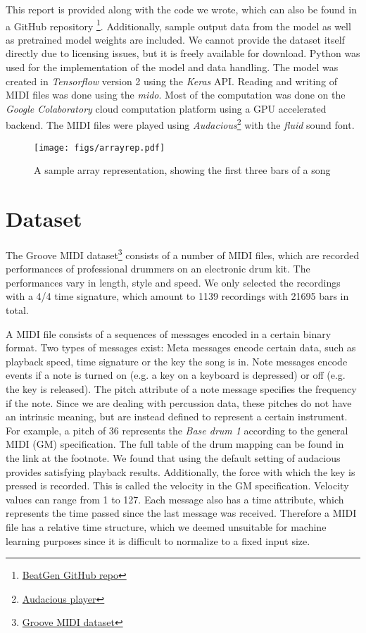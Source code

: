 \documentclass[journal]{Imperial_lab_report}
\begin{document}
This report is provided along with the code we wrote, which can also be found in a GitHub repository \footnote{\href{https://github.com/jlindermeir/beatgen}{BeatGen GitHub repo}}. Additionally, sample output data from the model as well as pretrained model weights are included. We cannot provide the dataset itself directly due to licensing issues, but it is freely available for download.
Python was used for the implementation of the model and data handling. The model was created in \emph{Tensorflow} version 2 using the \emph{Keras} API. Reading and writing of MIDI files was done using the \emph{mido}. Most of the computation was done on the \emph{Google Colaboratory} cloud computation platform using a GPU accelerated backend. The MIDI files were played using \emph{Audacious}\footnote{\href{https://audacious-media-player.org/}{Audacious player}} with the \emph{fluid} sound font.
\begin{figure}[t]
    \centering
    \texttt{[image: figs/arrayrep.pdf]}
    \caption{A sample array representation, showing the first three bars of a song}
    \label{fig:arrayrep}
\end{figure}
\section{Dataset}
The Groove MIDI dataset\footnote{\href{https://magenta.tensorflow.org/datasets/groove}{Groove MIDI dataset}} consists of a number of MIDI files, which are recorded performances of professional drummers on an electronic drum kit. The performances vary in length, style and speed. We only selected the recordings with a 4/4 time signature, which amount to 1139 recordings with 21695 bars in total.

A MIDI file consists of a sequences of messages encoded in a certain binary format. Two types of messages exist: Meta messages encode certain data, such as playback speed, time signature or the key the song is in. Note messages encode events if a note is turned on (e.g. a key on a keyboard is depressed) or off (e.g. the key is released). The pitch attribute of a note message specifies the frequency if the note. Since we are dealing with percussion data, these pitches do not have an intrinsic meaning, but are instead defined to represent a certain instrument. For example, a pitch of 36 represents the \emph{Base drum 1} according to the general MIDI (GM) specification. The full table of the drum mapping can be found in the link at the footnote. We found that using the default setting of audacious provides satisfying playback results. Additionally, the force with which the key is pressed is recorded. This is called the velocity in the GM specification. Velocity values can range from 1 to 127. Each message also has a time attribute, which represents the time passed since the last message was received. Therefore a MIDI file has a relative time structure, which we deemed unsuitable for machine learning purposes since it is difficult to normalize to a fixed input size.
\end{document}
